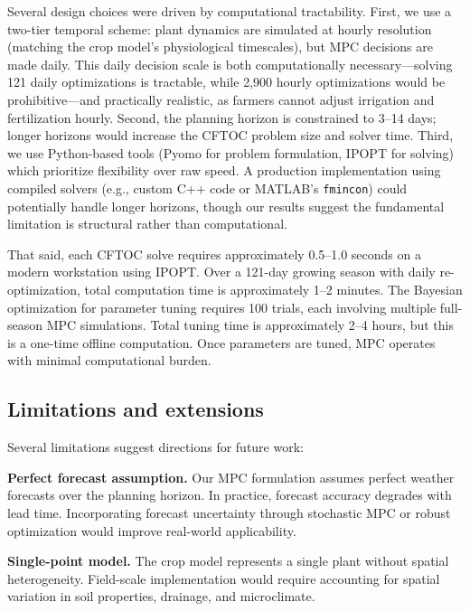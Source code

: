 \documentclass[preprint,12pt]{elsarticle}
\begin{document}
Several design choices were driven by computational tractability. First, we use a two-tier temporal scheme: plant dynamics are simulated at hourly resolution (matching the crop model's physiological timescales), but MPC decisions are made daily. This daily decision scale is both computationally necessary---solving 121 daily optimizations is tractable, while 2,900 hourly optimizations would be prohibitive---and practically realistic, as farmers cannot adjust irrigation and fertilization hourly. Second, the planning horizon is constrained to 3--14 days; longer horizons would increase the CFTOC problem size and solver time. Third, we use Python-based tools (Pyomo for problem formulation, IPOPT for solving) which prioritize flexibility over raw speed. A production implementation using compiled solvers (e.g., custom C++ code or MATLAB's \texttt{fmincon}) could potentially handle longer horizons, though our results suggest the fundamental limitation is structural rather than computational.

That said, each CFTOC solve requires approximately 0.5--1.0 seconds on a modern workstation using IPOPT. Over a 121-day growing season with daily re-optimization, total computation time is approximately 1--2 minutes. The Bayesian optimization for parameter tuning requires 100 trials, each involving multiple full-season MPC simulations. Total tuning time is approximately 2--4 hours, but this is a one-time offline computation. Once parameters are tuned, MPC operates with minimal computational burden.

\subsection{Limitations and extensions}\label{subsec:limitations}

Several limitations suggest directions for future work:

\textbf{Perfect forecast assumption.} Our MPC formulation assumes perfect weather forecasts over the planning horizon. In practice, forecast accuracy degrades with lead time. Incorporating forecast uncertainty through stochastic MPC or robust optimization would improve real-world applicability.

\textbf{Single-point model.} The crop model represents a single plant without spatial heterogeneity. Field-scale implementation would require accounting for spatial variation in soil properties, drainage, and microclimate.
\end{document}
